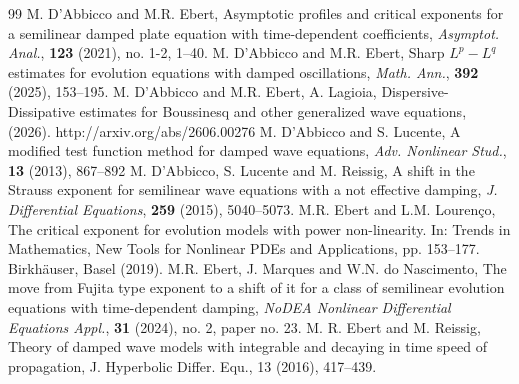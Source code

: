 \documentclass[10pt]{article}
\newcommand{\<}{\langle}
\renewcommand{\>}{\rangle}
\numberwithin{equation}{section}
\begin{document}
\begin{thebibliography}{99}
M. D'Abbicco and M.R. Ebert, Asymptotic profiles and critical exponents for a semilinear damped plate equation with time-dependent coefficients, \textit{Asymptot. Anal.}, \textbf{123} (2021), no. 1-2, 1--40.
M. D'Abbicco and M.R. Ebert, Sharp $L^p - L^q$ estimates for evolution equations with damped oscillations, \textit{Math. Ann.}, \textbf{392} (2025), 153--195. %
M. D'Abbicco and M.R. Ebert, A. Lagioia, Dispersive-Dissipative estimates for Boussinesq and other generalized wave equations, (2026).
http://arxiv.org/abs/2606.00276
M. D'Abbicco and S. Lucente, A modified test function method for damped wave equations, \textit{Adv. Nonlinear Stud.}, \textbf{13} (2013), 867--892
M. D'Abbicco, S. Lucente and M. Reissig, A shift in the Strauss exponent for semilinear wave equations with a not effective damping, \textit{J. Differential Equations}, \textbf{259} (2015), 5040--5073.
M.R. Ebert and L.M. Louren\c{c}o, The critical exponent for evolution models with power non-linearity. In: Trends in Mathematics, New Tools for Nonlinear PDEs and Applications, pp. 153--177. Birkh\"auser, Basel (2019).
M.R. Ebert, J. Marques and W.N. do Nascimento, The move from Fujita type exponent to a shift of it for a class of semilinear evolution equations with time-dependent damping, \emph{NoDEA Nonlinear Differential Equations Appl.}, \textbf{31} (2024), no. 2, paper no. 23.
 M. R. Ebert and M. Reissig, Theory of damped wave models with integrable and
decaying in time speed of propagation, J. Hyperbolic Differ. Equ., 13 (2016), 417--439.


\end{thebibliography}
\end{document}
